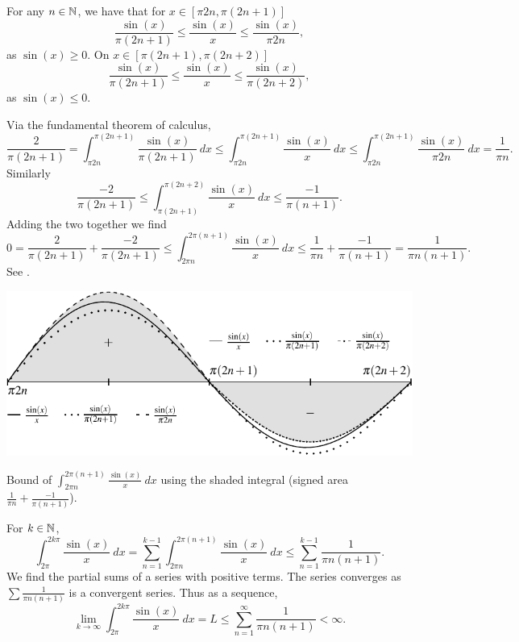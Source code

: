 \begin{example}
For any $n \in {\mathbb{N}}$, we have that for $x \in [\pi 2n, \pi (2n+1)]$
\begin{equation*}
\frac{\sin(x)}{\pi (2n+1)}
\leq
\frac{\sin(x)}{x}
\leq
\frac{\sin(x)}{\pi 2n} ,
\end{equation*}
as $\sin(x) \geq 0$.  On $x \in [\pi (2n+1), \pi (2n+2)]$
\begin{equation*}
\frac{\sin(x)}{\pi (2n+1)}
\leq
\frac{\sin(x)}{x}
\leq
\frac{\sin(x)}{\pi (2n+2)} ,
\end{equation*}
as $\sin(x) \leq 0$.

Via the fundamental theorem of calculus,
\begin{equation*}
\frac{2}{\pi (2n+1)}
=
\int_{\pi 2n}^{\pi (2n+1)}
\frac{\sin(x)}{\pi (2n+1)}
~dx
\leq
\int_{\pi 2n}^{\pi (2n+1)}
\frac{\sin(x)}{x}
~dx
\leq
\int_{\pi 2n}^{\pi (2n+1)}
\frac{\sin(x)}{\pi 2n}
~dx
=
\frac{1}{\pi n} .
\end{equation*}
Similarly
\begin{equation*}
\frac{-2}{\pi (2n+1)}
\leq
\int_{\pi (2n+1)}^{\pi (2n+2)}
\frac{\sin(x)}{x}
~dx
\leq
\frac{-1}{\pi (n+1)} .
\end{equation*}
Adding the two together we find
\begin{equation*}
0
=
\frac{2}{\pi (2n+1)}
+
\frac{-2}{\pi (2n+1)}
\leq
\int_{2\pi n}^{2\pi (n+1)}
\frac{\sin(x)}{x}
~dx
\leq
\frac{1}{\pi n} 
+
\frac{-1}{\pi (n+1)} 
=
\frac{1}{\pi n(n+1)} .
\end{equation*}
See .
\begin{myfigureht}
\includegraphics{figures/sincbound}
\caption{Bound of $\int_{2\pi n}^{2\pi (n+1)} \frac{\sin(x)}{x} ~dx$ using
the shaded integral (signed area
$\frac{1}{\pi n} 
+
\frac{-1}{\pi (n+1)}$).\label{fig:sincbound}}
\end{myfigureht}

For $k \in {\mathbb{N}}$, 
\begin{equation*}
\int_{2\pi}^{2k\pi} \frac{\sin(x)}{x} ~dx
=
\sum_{n=1}^{k-1}
\int_{2\pi n}^{2\pi (n+1)} \frac{\sin(x)}{x} ~dx 
\leq
\sum_{n=1}^{k-1}
\frac{1}{\pi n(n+1)} .
\end{equation*}
We find the partial sums of a series with positive terms.
The series
converges as
$\sum \frac{1}{\pi n (n+1)}$ is a convergent series.  Thus
as a sequence,
\begin{equation*}
\lim_{k\to \infty} \int_{2\pi}^{2k\pi} \frac{\sin(x)}{x} ~dx
=L \leq
\sum_{n=1}^{\infty}
\frac{1}{\pi n(n+1)} < \infty .
\end{equation*}


\end{example}
